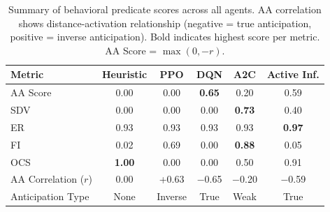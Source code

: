 \begin{table}[t]
\caption{Summary of behavioral predicate scores across all agents. AA correlation shows distance-activation relationship (negative = true anticipation, positive = inverse anticipation). Bold indicates highest score per metric. AA Score = $\max(0, -r)$.}
\label{tab:results}
\centering
\small
\begin{tabular}{lccccc}
\toprule
Metric & Heuristic & PPO & DQN & A2C & Active Inf. \\
\midrule
AA Score & 0.00 & 0.00 & \textbf{0.65} & 0.20 & 0.59 \\
SDV & 0.00 & 0.00 & 0.00 & \textbf{0.73} & 0.40 \\
ER & 0.93 & 0.93 & 0.93 & 0.93 & \textbf{0.97} \\
FI & 0.02 & 0.69 & 0.00 & \textbf{0.88} & 0.05 \\
OCS & \textbf{1.00} & 0.00 & 0.00 & 0.50 & 0.91 \\
\midrule
AA Correlation ($r$) & 0.00 & +0.63 & $-$0.65 & $-$0.20 & $-$0.59 \\
Anticipation Type & None & Inverse & True & Weak & True \\
\bottomrule
\end{tabular}
\end{table}
